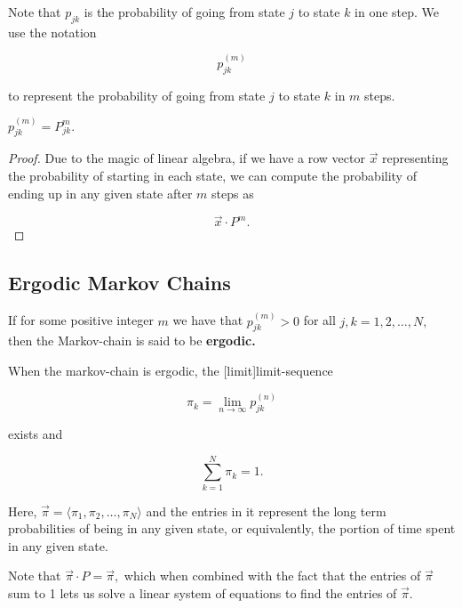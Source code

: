 \documentclass{article}
\begin{document}
\detach

\begin{note}
Note that $p_{jk}$ is the \@{probability} of going from state $j$ to state $k$ in one step. We use the notation

\[ p_{jk}^{(m)} \]

to represent the probability of going from state $j$ to state $k$ in $m$ steps.
\end{note}

\begin{theorem}
$p_{jk}^{(m)} = P_{jk}^m.$
\end{theorem}

\begin{proof}
Due to the magic of linear algebra, if we have a row \@{vector} $\vec{x}$ representing the \@{probability} of starting in each state, we can compute the probability of ending up in any given state after $m$ steps as

\[ \vec{x} \cdot P^m. \]
\end{proof}

\subsection{Ergodic Markov Chains}

\begin{definition}[Ergodic]
If for some positive integer $m$ we have that $p_{jk}^{(m)} > 0$ for all $j,k = 1,2,\dots,N,$ then the \@{Markov-chain} is said to be \textbf{ergodic.}
\end{definition}

\begin{theorem}\label{stationary-distribution}
When the \@{markov-chain} is \@{ergodic}, the \@[limit]{limit-sequence}

\[ \pi_k = \lim_{n \to \infty} p_{jk}^{(n)} \]

exists and

\[ \sum_{k=1}^N \pi_k = 1. \]
\end{theorem}

\begin{note}
Here, $\vec{\pi} = \langle \pi_1, \pi_2, \dots, \pi_N \rangle$ and the \@{entries} in it represent the long term \@{probabilities} of being in any given state, or equivalently, the portion of time spent in any given state.

Note that $\vec{\pi} \cdot P = \vec{\pi},$ which when combined with the fact that the entries of $\vec{\pi}$ sum to 1 lets us solve a linear system of equations to find the entries of $\vec{\pi}.$
\end{note}
\end{document}
